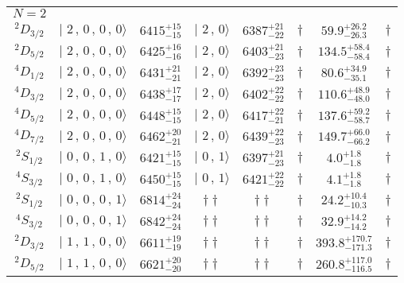 \begin{tabular}{c| c c c c c c c}
\hline
 $N=2$  &  &  &  &  &  \\ 
$^{2}D_{3/2}$ & $\vert \,\,2\,,\,0\,,\,0\,,\,0 \rangle $ & $6415^{+15}_{-15}$ & $\vert \,\,2\,,\,0 \rangle$ & $6387^{+21}_{-22}$ & $\dagger$ & $59.9^{+26.2}_{-26.3}$ & $\dagger$ \\ 
$^{2}D_{5/2}$ & $\vert \,\,2\,,\,0\,,\,0\,,\,0 \rangle $ & $6425^{+16}_{-16}$ & $\vert \,\,2\,,\,0 \rangle$ & $6403^{+21}_{-23}$ & $\dagger$ & $134.5^{+58.4}_{-58.4}$ & $\dagger$ \\ 
$^{4}D_{1/2}$ & $\vert \,\,2\,,\,0\,,\,0\,,\,0 \rangle $ & $6431^{+21}_{-21}$ & $\vert \,\,2\,,\,0 \rangle$ & $6392^{+23}_{-23}$ & $\dagger$ & $80.6^{+34.9}_{-35.1}$ & $\dagger$ \\ 
$^{4}D_{3/2}$ & $\vert \,\,2\,,\,0\,,\,0\,,\,0 \rangle $ & $6438^{+17}_{-17}$ & $\vert \,\,2\,,\,0 \rangle$ & $6402^{+22}_{-22}$ & $\dagger$ & $110.6^{+48.9}_{-48.0}$ & $\dagger$ \\ 
$^{4}D_{5/2}$ & $\vert \,\,2\,,\,0\,,\,0\,,\,0 \rangle $ & $6448^{+15}_{-15}$ & $\vert \,\,2\,,\,0 \rangle$ & $6417^{+22}_{-21}$ & $\dagger$ & $137.6^{+59.2}_{-58.7}$ & $\dagger$ \\ 
$^{4}D_{7/2}$ & $\vert \,\,2\,,\,0\,,\,0\,,\,0 \rangle $ & $6462^{+20}_{-21}$ & $\vert \,\,2\,,\,0 \rangle$ & $6439^{+22}_{-23}$ & $\dagger$ & $149.7^{+66.0}_{-66.2}$ & $\dagger$ \\ 
$^{2}S_{1/2}$ & $\vert \,\,0\,,\,0\,,\,1\,,\,0 \rangle $ & $6421^{+15}_{-15}$ & $\vert \,\,0\,,\,1 \rangle$ & $6397^{+21}_{-23}$ & $\dagger$ & $4.0^{+1.8}_{-1.8}$ & $\dagger$ \\ 
$^{4}S_{3/2}$ & $\vert \,\,0\,,\,0\,,\,1\,,\,0 \rangle $ & $6450^{+15}_{-15}$ & $\vert \,\,0\,,\,1 \rangle$ & $6421^{+22}_{-22}$ & $\dagger$ & $4.1^{+1.8}_{-1.8}$ & $\dagger$ \\ 
$^{2}S_{1/2}$ & $\vert \,\,0\,,\,0\,,\,0\,,\,1 \rangle $ & $6814^{+24}_{-24}$ & $\dagger\dagger$ & $\dagger\dagger$ & $\dagger$ & $24.2^{+10.4}_{-10.3}$ & $\dagger$ \\ 
$^{4}S_{3/2}$ & $\vert \,\,0\,,\,0\,,\,0\,,\,1 \rangle $ & $6842^{+24}_{-24}$ & $\dagger\dagger$ & $\dagger\dagger$ & $\dagger$ & $32.9^{+14.2}_{-14.2}$ & $\dagger$ \\ 
$^{2}D_{3/2}$ & $\vert \,\,1\,,\,1\,,\,0\,,\,0 \rangle $ & $6611^{+19}_{-19}$ & $\dagger\dagger$ & $\dagger\dagger$ & $\dagger$ & $393.8^{+170.7}_{-171.3}$ & $\dagger$ \\ 
$^{2}D_{5/2}$ & $\vert \,\,1\,,\,1\,,\,0\,,\,0 \rangle $ & $6621^{+20}_{-20}$ & $\dagger\dagger$ & $\dagger\dagger$ & $\dagger$ & $260.8^{+117.0}_{-116.5}$ & $\dagger$ \\ 

\end{tabular}
